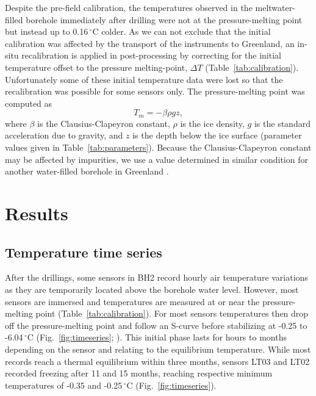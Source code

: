 \documentclass[utf8]{article}
\begin{document}
    Despite the pre-field calibration, the temperatures observed in the
    meltwater-filled borehole immediately after drilling were not at the
    pressure-melting point but instead up to 0.16\,$^\circ$C colder.
    As we can not exclude that the initial calibration was affected by the
    transport of the instruments to Greenland, an in-situ recalibration
    is applied in post-processing by correcting for the initial
    temperature offset to the pressure melting-point, $\Delta
    T$ (Table~\ref{tab:calibration}). Unfortunately some of these initial
    temperature data were lost so that the recalibration was possible for
    some sensors only. The pressure-melting point was computed as
    \begin{equation}
      T_m = -\beta \rho g z,
    \end{equation}
    where $\beta$ is the Clausius-Clapeyron constant,
    $\rho$ is the ice density, $g$ is the standard
    acceleration due to gravity, and $z$ is the depth below the ice surface
    (parameter values given in Table~\ref{tab:parameters}).
    Because the Clausius-Clapeyron constant may be affected by
    impurities, we use a value determined in similar condition for
    another water-filled borehole in Greenland \citep[][]{Luthi.etal.2002}.


\section{Results}

\subsection{Temperature time series}

    After the drillings, some sensors in BH2 record hourly air temperature
    variations as they are temporarily located above the borehole water level.
    However, most sensors are immersed and temperatures are measured at or near
    the pressure-melting point (Table~\ref{tab:calibration}). For most sensors
    temperatures then drop off the pressure-melting point and follow an S-curve
    before stabilizing at -0.25 to -6.04\,$^\circ$C
    (Fig.~\ref{fig:timeseries}; \citealp[cf. Fig.~3.6 of][]{Ryser.2014}). This
    initial phase lasts for hours to months
    depending on the sensor and relating to the equilibrium temperature. While
    most records reach a thermal equilibrium within three months, sensors LT03
    and LT02 recorded freezing after 11 and 15 months, reaching respective
    minimum temperatures of -0.35 and -0.25\,$^\circ$C
    (Fig.~\ref{fig:timeseries}).
\end{document}
